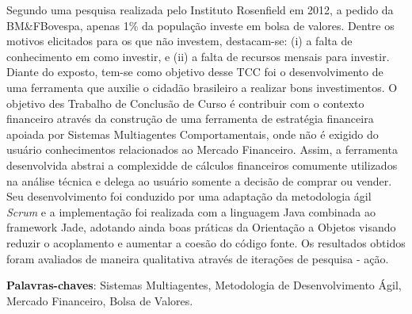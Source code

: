 \begin{resumo}[Resumo]
 


 \vspace{\onelineskip}
    Segundo uma pesquisa realizada pelo Instituto Rosenfield em 2012, a pedido da BM\&FBovespa, apenas 1\% da população investe em bolsa de valores. Dentre os motivos elicitados para os que não investem, destacam-se: (i) a falta de conhecimento em como investir, e (ii) a falta de recursos mensais para investir. Diante do exposto, tem-se como objetivo desse TCC foi o desenvolvimento de uma ferramenta que auxilie o cidadão brasileiro a realizar bons investimentos. O objetivo des Trabalho de Conclusão de Curso é contribuir com o contexto financeiro através da construção de uma ferramenta de estratégia financeira apoiada por Sistemas Multiagentes Comportamentais, onde não é exigido do usuário conhecimentos relacionados ao Mercado Financeiro. Assim, a ferramenta desenvolvida abstrai a complexidde de cálculos financeiros comumente utilizados na análise técnica e delega ao usuário somente a decisão de comprar ou vender. Seu desenvolvimento foi conduzido por uma adaptação da metodologia ágil \textit{Scrum} e a implementação foi realizada com a linguagem Java combinada ao framework Jade, adotando ainda boas práticas da Orientação a Objetos visando reduzir o acoplamento e aumentar a coesão do código fonte. Os resultados obtidos foram avaliados de maneira qualitativa através de iterações de pesquisa - ação.

    
 \noindent
 \textbf{Palavras-chaves}: Sistemas Multiagentes, Metodologia de Desenvolvimento Ágil, Mercado Financeiro, Bolsa de Valores.
\end{resumo}
